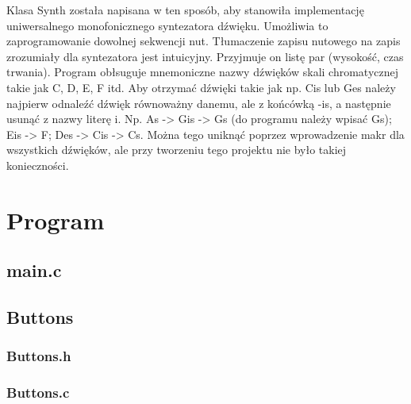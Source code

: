 \documentclass[fleqn]{article}
\begin{document}
Klasa Synth została napisana w ten sposób, aby stanowiła implementację uniwersalnego monofonicznego syntezatora dźwięku. Umożliwia to zaprogramowanie dowolnej sekwencji nut. Tłumaczenie zapisu nutowego na zapis zrozumiały dla syntezatora jest intuicyjny. Przyjmuje on listę par (wysokość, czas trwania). Program obłsuguje mnemoniczne nazwy dźwięków skali chromatycznej takie jak C, D, E, F itd. Aby otrzymać dźwięki takie jak np. Cis lub Ges należy najpierw odnaleźć dźwięk równoważny danemu, ale z końcówką -is, a następnie usunąć z nazwy literę i. Np. As -> Gis -> Gs (do programu należy wpisać Gs); Eis -> F; Des -> Cis -> Cs. Można tego uniknąć poprzez wprowadzenie makr dla wszystkich dźwięków, ale przy tworzeniu tego projektu nie było takiej konieczności.

\pagebreak

\section{Program}
\subsection{main.c}

\noindent\begin{minipage}[t]{.45\textwidth}
	
\end{minipage}\hfill
\noindent\begin{minipage}[t]{.45\textwidth}
	
\end{minipage}\hfill
\pagebreak

\noindent\begin{minipage}[t]{.45\textwidth}
	
\end{minipage}\hfill
\noindent\begin{minipage}[t]{.45\textwidth}
	
	\subsection{Buttons}
	\subsubsection{Buttons.h}
	
	\subsubsection{Buttons.c}
	
\end{minipage}\hfill
\end{document}
